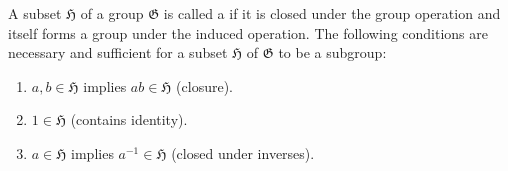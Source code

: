A subset $\mathfrak{H}$ of a group $\mathfrak{G}$ is called a  if it is closed under the group operation and itself forms a group under the induced operation. The following conditions are necessary and sufficient for a subset $\mathfrak{H}$ of $\mathfrak{G}$ to be a subgroup:

\begin{enumerate}
\item $a, b \in \mathfrak{H}$ implies $ab \in \mathfrak{H}$ (closure).
\item $1 \in \mathfrak{H}$ (contains identity).
\item $a \in \mathfrak{H}$ implies $a^{-1} \in \mathfrak{H}$ (closed under inverses).
\end{enumerate}
